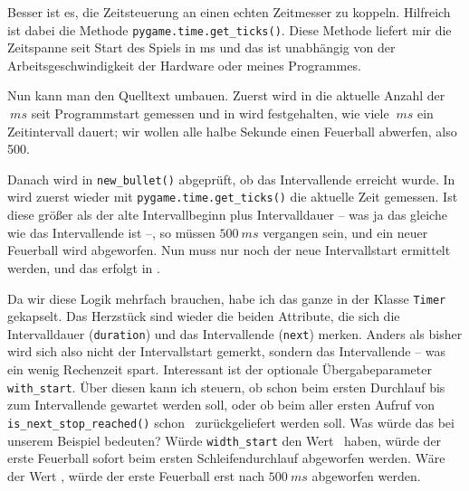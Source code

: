Besser ist es, die Zeitsteuerung an einen echten Zeitmesser zu koppeln. Hilfreich ist dabei die Methode \texttt{pygame.time.get\_ticks()}. Diese Methode liefert mir die Zeitspanne seit Start des Spiels in \gls{ms} und das ist unabhängig von der Arbeitsgeschwindigkeit der Hardware oder meines Programmes.

Nun kann man den Quelltext umbauen. Zuerst wird in  die aktuelle Anzahl der $~ms$ seit Programmstart gemessen und in  wird festgehalten, wie viele $~ms$ ein Zeitintervall dauert; wir wollen alle halbe Sekunde einen Feuerball abwerfen, also 500.


Danach wird in \texttt{new\_bullet()} abgeprüft, ob das Intervallende erreicht wurde. In  wird zuerst wieder mit \texttt{pygame.time.get\_ticks()} die aktuelle Zeit gemessen. Ist diese größer als der alte Intervallbeginn plus Intervalldauer -- was ja das gleiche wie das Intervallende ist --, so müssen $500~ms$ vergangen sein, und ein neuer Feuerball wird abgeworfen. Nun muss nur noch der neue Intervallstart ermittelt werden, und das erfolgt in .


Da wir diese Logik mehrfach brauchen, habe ich das ganze in der Klasse \texttt{Timer} gekapselt. Das Herzstück sind wieder die beiden Attribute, die sich die Intervalldauer (\texttt{duration}) und das Intervallende (\texttt{next})  merken. Anders als bisher wird sich also nicht der Intervallstart gemerkt, sondern das Intervallende -- was ein wenig Rechenzeit spart. Interessant ist der optionale Übergabeparameter \texttt{with\_start}. Über diesen kann ich steuern, ob schon beim ersten Durchlauf bis zum Intervallende gewartet werden soll, oder ob beim aller ersten Aufruf von \texttt{is\_next\_stop\_reached()} schon \true\ zurückgeliefert werden soll. Was würde das bei unserem Beispiel bedeuten? Würde \texttt{width\_start} den Wert \true\ haben, würde der erste Feuerball sofort beim ersten Schleifendurchlauf abgeworfen werden. Wäre der Wert \false, würde der erste Feuerball erst nach $500~ms$ abgeworfen werden.

